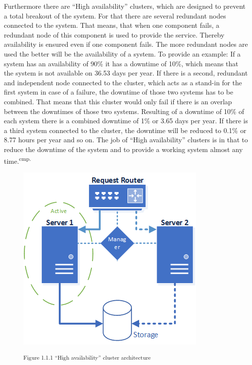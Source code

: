 Furthermore there are ``High availability'' clusters, which are designed to prevent a total breakout of the system. For that there are several redundant nodes connected to the system. That means, that when one component fails, a redundant node of this component is used to provide the service. Thereby availability is ensured even if one component fails. The more redundant nodes are used the better will be the availability of a system. To provide an example: If a system has an availability of 90\% it has a downtime of 10\%, which means that the system is not available on 36.53 days per year. If there is a second, redundant and independent node connected to the cluster, which acts as a stand-in for the first system in case of a failure, the downtime of those two systems has to be combined. That means that this cluster would only fail if there is an overlap between the downtimes of those two systems. Resulting of a downtime of 10\% of each system there is a combined downtime of 1\% or 3.65 days per year. If there is a third system connected to the cluster, the downtime will be reduced to 0.1\% or 8.77 hours per year and so on. The job of ``High availability'' clusters is in that to reduce the downtime of the system and to provide a working system almost any time.\textsuperscript{cmp.\cite{3}}


\begin{figure}[h]
\centering
\includegraphics[width=\textwidth/2]{images/ha_cluster_architecture.png}

\textsuperscript{Figure 1.1.1 ``High availability'' cluster architecture}
\end{figure}

